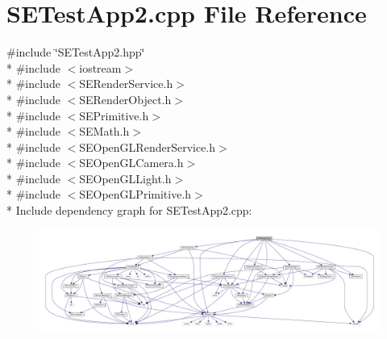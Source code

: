 \section{S\+E\+Test\+App2.\+cpp File Reference}
\label{_s_e_test_app2_8cpp}
{\ttfamily \#include \char`\"{}S\+E\+Test\+App2.\+hpp\char`\"{}}\\*
{\ttfamily \#include $<$iostream$>$}\\*
{\ttfamily \#include $<$S\+E\+Render\+Service.\+h$>$}\\*
{\ttfamily \#include $<$S\+E\+Render\+Object.\+h$>$}\\*
{\ttfamily \#include $<$S\+E\+Primitive.\+h$>$}\\*
{\ttfamily \#include $<$S\+E\+Math.\+h$>$}\\*
{\ttfamily \#include $<$S\+E\+Open\+G\+L\+Render\+Service.\+h$>$}\\*
{\ttfamily \#include $<$S\+E\+Open\+G\+L\+Camera.\+h$>$}\\*
{\ttfamily \#include $<$S\+E\+Open\+G\+L\+Light.\+h$>$}\\*
{\ttfamily \#include $<$S\+E\+Open\+G\+L\+Primitive.\+h$>$}\\*
Include dependency graph for S\+E\+Test\+App2.\+cpp\+:
\nopagebreak
\begin{figure}[H]
\begin{center}
\leavevmode
\includegraphics[width=350pt]{_s_e_test_app2_8cpp__incl}
\end{center}
\end{figure}
